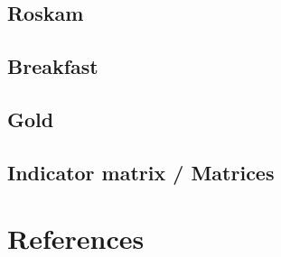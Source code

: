 \documentclass[
  12pt,
]{article}
\begin{document}
\subsection{Roskam}\label{roskam}

\subsection{Breakfast}\label{breakfast}

\subsection{Gold}\label{gold}

\subsection{Indicator matrix / Matrices}\label{indicator-matrix-matrices}

\section*{References}\label{references}
\end{document}
